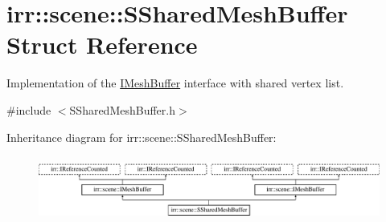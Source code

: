 \hypertarget{structirr_1_1scene_1_1SSharedMeshBuffer}{}\section{irr\+:\+:scene\+:\+:S\+Shared\+Mesh\+Buffer Struct Reference}
\label{structirr_1_1scene_1_1SSharedMeshBuffer}


Implementation of the \hyperlink{classirr_1_1scene_1_1IMeshBuffer}{I\+Mesh\+Buffer} interface with shared vertex list.  




{\ttfamily \#include $<$S\+Shared\+Mesh\+Buffer.\+h$>$}

Inheritance diagram for irr\+:\+:scene\+:\+:S\+Shared\+Mesh\+Buffer\+:\begin{figure}[H]
\begin{center}
\leavevmode
\includegraphics[height=2.164948cm]{structirr_1_1scene_1_1SSharedMeshBuffer}
\end{center}
\end{figure}
